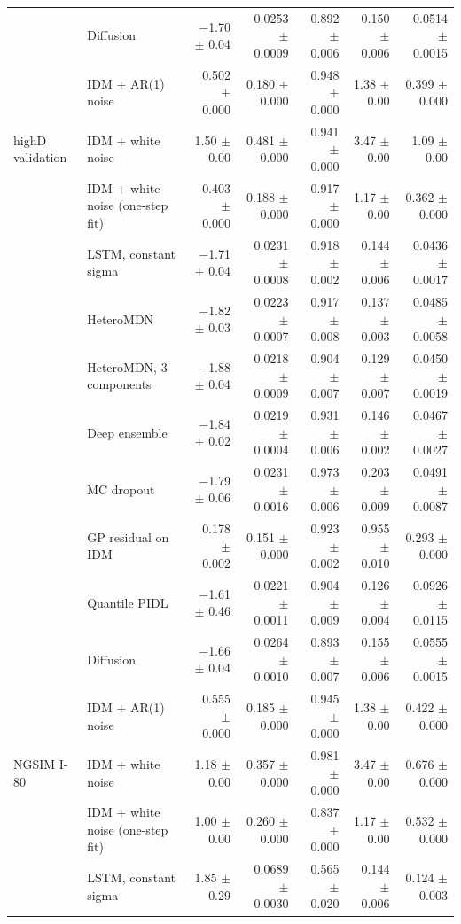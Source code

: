 \begin{longtable}{llrrrrr}
 & Diffusion & $-$1.70 $\pm$ 0.04 & 0.0253 $\pm$ 0.0009 & 0.892 $\pm$ 0.006 & 0.150 $\pm$ 0.006 & 0.0514 $\pm$ 0.0015 \\
 & IDM + AR(1) noise & 0.502 $\pm$ 0.000 & 0.180 $\pm$ 0.000 & 0.948 $\pm$ 0.000 & 1.38 $\pm$ 0.00 & 0.399 $\pm$ 0.000 \\
\midrule
highD validation & IDM + white noise & 1.50 $\pm$ 0.00 & 0.481 $\pm$ 0.000 & 0.941 $\pm$ 0.000 & 3.47 $\pm$ 0.00 & 1.09 $\pm$ 0.00 \\
 & IDM + white noise (one-step fit) & 0.403 $\pm$ 0.000 & 0.188 $\pm$ 0.000 & 0.917 $\pm$ 0.000 & 1.17 $\pm$ 0.00 & 0.362 $\pm$ 0.000 \\
 & LSTM, constant sigma & $-$1.71 $\pm$ 0.04 & 0.0231 $\pm$ 0.0008 & 0.918 $\pm$ 0.002 & 0.144 $\pm$ 0.006 & 0.0436 $\pm$ 0.0017 \\
 & HeteroMDN & $-$1.82 $\pm$ 0.03 & 0.0223 $\pm$ 0.0007 & 0.917 $\pm$ 0.008 & 0.137 $\pm$ 0.003 & 0.0485 $\pm$ 0.0058 \\
 & HeteroMDN, 3 components & $-$1.88 $\pm$ 0.04 & 0.0218 $\pm$ 0.0009 & 0.904 $\pm$ 0.007 & 0.129 $\pm$ 0.007 & 0.0450 $\pm$ 0.0019 \\
 & Deep ensemble & $-$1.84 $\pm$ 0.02 & 0.0219 $\pm$ 0.0004 & 0.931 $\pm$ 0.006 & 0.146 $\pm$ 0.002 & 0.0467 $\pm$ 0.0027 \\
 & MC dropout & $-$1.79 $\pm$ 0.06 & 0.0231 $\pm$ 0.0016 & 0.973 $\pm$ 0.006 & 0.203 $\pm$ 0.009 & 0.0491 $\pm$ 0.0087 \\
 & GP residual on IDM & 0.178 $\pm$ 0.002 & 0.151 $\pm$ 0.000 & 0.923 $\pm$ 0.002 & 0.955 $\pm$ 0.010 & 0.293 $\pm$ 0.000 \\
 & Quantile PIDL & $-$1.61 $\pm$ 0.46 & 0.0221 $\pm$ 0.0011 & 0.904 $\pm$ 0.009 & 0.126 $\pm$ 0.004 & 0.0926 $\pm$ 0.0115 \\
 & Diffusion & $-$1.66 $\pm$ 0.04 & 0.0264 $\pm$ 0.0010 & 0.893 $\pm$ 0.007 & 0.155 $\pm$ 0.006 & 0.0555 $\pm$ 0.0015 \\
 & IDM + AR(1) noise & 0.555 $\pm$ 0.000 & 0.185 $\pm$ 0.000 & 0.945 $\pm$ 0.000 & 1.38 $\pm$ 0.00 & 0.422 $\pm$ 0.000 \\
\midrule
NGSIM I-80 & IDM + white noise & 1.18 $\pm$ 0.00 & 0.357 $\pm$ 0.000 & 0.981 $\pm$ 0.000 & 3.47 $\pm$ 0.00 & 0.676 $\pm$ 0.000 \\
 & IDM + white noise (one-step fit) & 1.00 $\pm$ 0.00 & 0.260 $\pm$ 0.000 & 0.837 $\pm$ 0.000 & 1.17 $\pm$ 0.00 & 0.532 $\pm$ 0.000 \\
 & LSTM, constant sigma & 1.85 $\pm$ 0.29 & 0.0689 $\pm$ 0.0030 & 0.565 $\pm$ 0.020 & 0.144 $\pm$ 0.006 & 0.124 $\pm$ 0.003 \\

\end{longtable}
